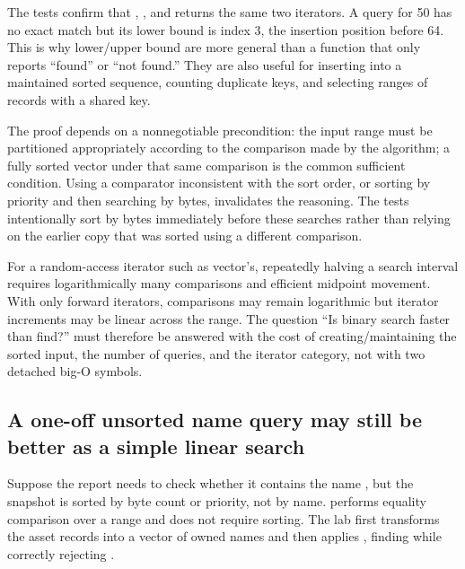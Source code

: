 The tests confirm that , , and  returns the same two iterators. A query for 50 has no exact match but its lower bound is index 3, the insertion position before 64. This is why lower/upper bound are more general than a function that only reports ``found'' or ``not found.'' They are also useful for inserting into a maintained sorted sequence, counting duplicate keys, and selecting ranges of records with a shared key.

The proof depends on a nonnegotiable precondition: the input range must be partitioned appropriately according to the comparison made by the algorithm; a fully sorted vector under that same comparison is the common sufficient condition. Using a comparator inconsistent with the sort order, or sorting by priority and then searching by bytes, invalidates the reasoning. The tests intentionally sort by bytes immediately before these searches rather than relying on the earlier copy that was sorted using a different comparison.

For a random-access iterator such as vector's, repeatedly halving a search interval requires logarithmically many comparisons and efficient midpoint movement. With only forward iterators, comparisons may remain logarithmic but iterator increments may be linear across the range. The question ``Is binary search faster than find?'' must therefore be answered with the cost of creating/maintaining the sorted input, the number of queries, and the iterator category, not with two detached big-O symbols.

\subsection{A one-off unsorted name query may still be better as a simple linear search}\label{05-engine-i-ch006-a-one-off-unsorted-name-query-may-still-be-better-as-a-simple-linear-search}

\hypertarget{05-engine-i-ch006-a-one-off-unsorted-name-query-may-still-be-better-as-a-simple-linear-search}{}

Suppose the report needs to check whether it contains the name , but the snapshot is sorted by byte count or priority, not by name.  performs equality comparison over a range and does not require sorting. The lab first transforms the asset records into a vector of owned names and then applies , finding  while correctly rejecting .

